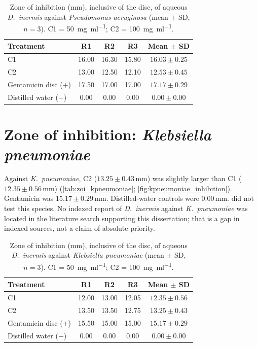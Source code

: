 \begin{table}[htbp]
  \centering
  \caption{Zone of inhibition (mm), inclusive of the disc, of aqueous \textit{D.\ inermis} against \textit{Pseudomonas aeruginosa} (mean $\pm$ SD, $n = 3$). C1 = \qty{50}{\milli\gram\per\milli\litre}; C2 = \qty{100}{\milli\gram\per\milli\litre}.}
  \label{tab:zoi_paeruginosa}
  \begin{tabular}{lcccc}
    \toprule
    Treatment & R1 & R2 & R3 & Mean $\pm$ SD \\
    \midrule
    C1 & 16.00 & 16.30 & 15.80 & $16.03 \pm 0.25$ \\
    C2 & 13.00 & 12.50 & 12.10 & $12.53 \pm 0.45$ \\
    Gentamicin disc ($+$) & 17.50 & 17.00 & 17.00 & $17.17 \pm 0.29$ \\
    Distilled water ($-$) & 0.00 & 0.00 & 0.00 & $0.00 \pm 0.00$ \\
    \bottomrule
  \end{tabular}
\end{table}

\section{Zone of inhibition: \textit{Klebsiella pneumoniae}}
\label{subsec:results_kpneumoniae}

Against \textit{K.\ pneumoniae}, C2 ($13.25 \pm 0.43$\,mm) was slightly larger than C1 ($12.35 \pm 0.56$\,mm) (\autoref{tab:zoi_kpneumoniae}; \autoref{fig:kpneumoniae_inhibition}). Gentamicin was $15.17 \pm 0.29$\,mm. Distilled-water controls were 0.00\,mm. \citet{drakhshaan2026} did not test this species. No indexed report of \textit{D.\ inermis} against \textit{K.\ pneumoniae} was located in the literature search supporting this dissertation; that is a gap in indexed sources, not a claim of absolute priority.

\begin{table}[htbp]
  \centering
  \caption{Zone of inhibition (mm), inclusive of the disc, of aqueous \textit{D.\ inermis} against \textit{Klebsiella pneumoniae} (mean $\pm$ SD, $n = 3$). C1 = \qty{50}{\milli\gram\per\milli\litre}; C2 = \qty{100}{\milli\gram\per\milli\litre}.}
  \label{tab:zoi_kpneumoniae}
  \begin{tabular}{lcccc}
    \toprule
    Treatment & R1 & R2 & R3 & Mean $\pm$ SD \\
    \midrule
    C1 & 12.00 & 13.00 & 12.05 & $12.35 \pm 0.56$ \\
    C2 & 13.50 & 13.50 & 12.75 & $13.25 \pm 0.43$ \\
    Gentamicin disc ($+$) & 15.50 & 15.00 & 15.00 & $15.17 \pm 0.29$ \\
    Distilled water ($-$) & 0.00 & 0.00 & 0.00 & $0.00 \pm 0.00$ \\
    \bottomrule
  \end{tabular}
\end{table}

